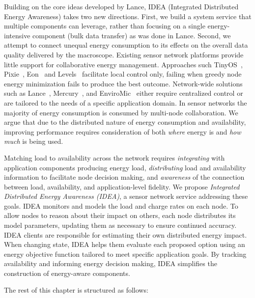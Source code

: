 Building on the core ideas developed by Lance, IDEA (Integrated Distributed
Energy Awareness) takes two new directions. First, we build a system service
that multiple components can leverage, rather than focusing on a single
energy-intensive component (bulk data transfer) as was done in Lance.
Second, we attempt to connect unequal energy consumption to its effects on
the overall data quality delivered by the macroscope.  Existing sensor
network platforms provide little support for collaborative energy management.
Approaches such TinyOS~\cite{tinyos-asplos00}, Pixie~\cite{pixie-sensys08},
Eon~\cite{eon-sensys07} and Levels~\cite{levels-sensys07} facilitate local
control only, failing when greedy node energy minimization fails to produce
the best outcome.  Network-wide solutions such as
Lance~\cite{lance-sensys08}, Mercury~\cite{parkinsons-embs07}, and
EnviroMic~\cite{enviromic} either require centralized control or are tailored
to the needs of a specific application domain. In sensor networks the
majority of energy consumption is consumed by multi-node collaboration. We
argue that due to the distributed nature of energy consumption and
availability, improving performance requires consideration of both
\textit{where} energy is and \textit{how much} is being used.

Matching load to availability across the network requires
\textit{integrating} with application components producing energy load,
\textit{distributing} load and availability information to facilitate node
decision making, and \textit{awareness} of the connection between load,
availability, and application-level fidelity. We propose \textit{Integrated
Distributed Energy Awareness (IDEA)}, a sensor network service addressing
these goals. IDEA monitors and models the load and charge rates on each node.
To allow nodes to reason about their impact on others, each node distributes
its model parameters, updating them as necessary to ensure continued
accuracy. IDEA clients are responsible for estimating their own distributed
energy impact. When changing state, IDEA helps them evaluate each proposed
option using an energy objective function tailored to meet specific
application goals. By tracking availability and informing energy decision
making, IDEA simplifies the construction of energy-aware components.

The rest of this chapter is structured as follows:

